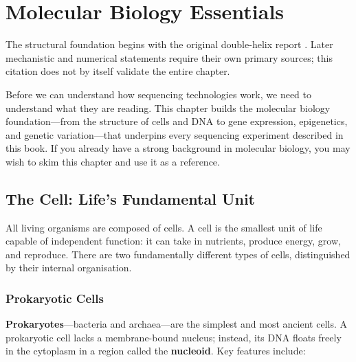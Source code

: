 \chapter{Molecular Biology Essentials}
\label{ch:molbio}

\begin{sourcebox}
The structural foundation begins with the original double-helix report \cite{watson1953}. Later mechanistic and numerical statements require their own primary sources; this citation does not by itself validate the entire chapter.
\end{sourcebox}

\begin{keyconcept}
Before we can understand how sequencing technologies work, we need to understand what they are reading. This chapter builds the molecular biology foundation---from the structure of cells and DNA to gene expression, epigenetics, and genetic variation---that underpins every sequencing experiment described in this book. If you already have a strong background in molecular biology, you may wish to skim this chapter and use it as a reference.
\end{keyconcept}

\section{The Cell: Life's Fundamental Unit}
\label{sec:molbio:cell}

All living organisms are composed of cells. A cell is the smallest unit of life capable of independent function: it can take in nutrients, produce energy, grow, and reproduce. There are two fundamentally different types of cells, distinguished by their internal organisation.

\subsection{Prokaryotic Cells}
\label{subsec:molbio:prokaryotes}

\textbf{Prokaryotes}---bacteria and archaea---are the simplest and most ancient cells. A prokaryotic cell lacks a membrane-bound nucleus; instead, its DNA floats freely in the cytoplasm in a region called the \textbf{nucleoid}. Key features include:

